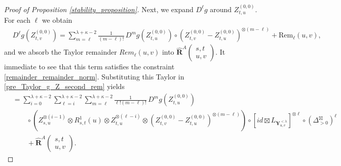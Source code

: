 \documentclass[10pt,a4paper]{amsart}
\begin{document}
\begin{proof}[Proof of Proposition \ref{stability_proposition}]
Next, we expand $D^\ell g$ around $Z^{(0,0)}_{t,u}$. For each $\ell$ we obtain
\begin{align*}
&D^\ell g\left(Z^{(0,0)}_{t,v}\right)
=
\sum_{m=\ell}^{\lambda+\kappa-2}\frac{1}{(m-\ell)!}\,
D^m g\left(Z^{(0,0)}_{t,u}\right)
\circ
\left(Z^{(0,0)}_{t,v}-Z^{(0,0)}_{t,u}\right)^{\otimes(m-\ell)}
+ \mathrm{Rem}_{\ell}(u,v),
\end{align*}
and we absorb the Taylor remainder $Rem_\ell(u,v)$ into
$\hat{\mathbf{R}}^{A}\begin{pmatrix} s,t \\ u, v \end{pmatrix}$. It immediate to see that this term satisfies the constraint \eqref{remainder_remainder_norm}. Substituting this Taylor in \eqref{pre_Taylor_g_Z_second_rem} yields
\begin{align*}
&=
\sum_{i=0}^{\lambda+\kappa-2}
\sum_{\ell=i}^{\lambda+\kappa-2}
\sum_{m=\ell}^{\lambda+\kappa-2}
\frac{1}{\ell!(m-\ell)!}\,
D^m g\left(Z^{(0,0)}_{t,u}\right)
\\
&\qquad\circ
\left(
Z^{\otimes(i-1)}_{s,u}\otimes R^{1}_{s,t}(u)\otimes Z^{\otimes(\ell-i)}_{t,u}
\otimes
\left(Z^{(0,0)}_{t,v}-Z^{(0,0)}_{t,u}\right)^{\otimes(m-\ell)}
\right)
\circ
\left[id \boxtimes L_{\mathbf{Y}^{<\lambda}_{u,v}}\right]^{\otimes\ell}
\circ (\Delta^{\boxtimes}_{>0})^\ell
\\
&\qquad + \hat{\mathbf{R}}^{A}\begin{pmatrix} s,t \\ u, v \end{pmatrix}.
\end{align*}


\end{proof}
\end{document}
